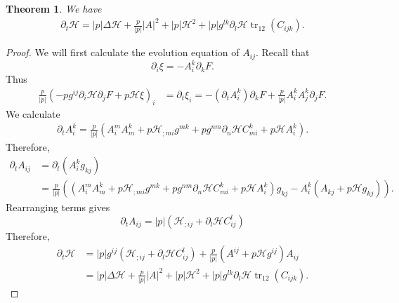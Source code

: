 \documentclass{amsart}
\newtheorem{theorem}{Theorem}
\theoremstyle{definition}
\theoremstyle{remark}
\numberwithin{equation}{section}
\begin{document}


\begin{theorem} We have
\begin{align*}
\partial_t\mathcal{H}= |p| \Delta \mathcal{H}+\frac{p}{|p|}| A |^2+ |p|  \mathcal{H}^2+ |p|  g^{lk}\partial_l\mathcal{H} \operatorname{tr}_{12}( C _{ijk}).
\end{align*}
\end{theorem}
\begin{proof}
We will first calculate the evolution equation of $ A _{ij}.$ Recall that $$\partial_i\xi=- A _i^k\partial_kF.$$ Thus
\begin{align*}
\frac{p}{|p|}\left(- p  g^{ij}\partial_i\mathcal{H}\partial_jF+ p  \mathcal{H}\xi\right)_i&=\partial_t\xi_i=-(\partial_t A _i^k)\partial_kF+\frac{p}{|p|} A _i^k A _j^k\partial_jF.
\end{align*}
We calculate
\begin{align*}
\partial_t A _i^k=\frac{p}{|p|}( A _i^m A _m^k+ p  \mathcal{H}_{;mi}g^{mk}+ p
g^{nm}\partial_n \mathcal{H} C _{mi}^k+ p  \mathcal{H} A _i^k).
\end{align*}
Therefore,
\begin{align*}
\partial_t A _{ij}&=\partial_t( A _i^kg_{kj})\\
&=\frac{p}{|p|}\left(\left( A _i^m A _m^k+ p  \mathcal{H}_{;mi}g^{mk}+ p
g^{nm}\partial_n \mathcal{H} C _{mi}^k+ p  \mathcal{H} A _i^k\right)g_{kj}- A _i^k
( A _{kj}+ p  \mathcal{H}g_{kj})\right).
\end{align*}
Rearranging terms gives
\[\partial_t  A _{ij}= |p|  (\mathcal{H}_{;ij}+  \partial_l\mathcal{H}  C _{ij}^l)\]
Therefore,
\begin{align*}
\partial_t\mathcal{H}&=|p|g^{ij}( \mathcal{H}_{;ij}+  \partial_l \mathcal{H} C ^l_{ij})+\frac{p}{|p|}( A ^{ij}+ p  \mathcal{H}g^{ij}) A _{ij}\\
&= |p| \Delta \mathcal{H}+\frac{p}{|p|}| A |^2+ |p|  \mathcal{H}^2+ |p|  g^{lk}\partial_l\mathcal{H} \operatorname{tr}_{12}( C _{ijk}).
\end{align*}
\end{proof}
\end{document}

